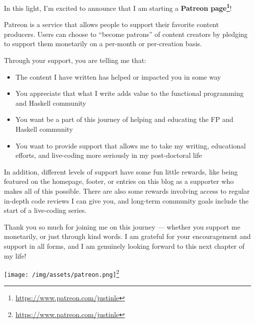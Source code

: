 \documentclass[]{article}
\renewcommand{\href}[2]{#2\footnote{\url{#1}}}
\begin{document}
In this light, I'm excited to announce that I am starting a
\textbf{\href{https://www.patreon.com/justinle}{Patreon page}}!

Patreon is a service that allows people to support their favorite content
producers. Users can choose to ``become patrons'' of content creators by
pledging to support them monetarily on a per-month or per-creation basis.

Through your support, you are telling me that:

\begin{itemize}
\tightlist
\item
  The content I have written has helped or impacted you in some way
\item
  You appreciate that what I write adds value to the functional programming and
  Haskell community
\item
  You want be a part of this journey of helping and educating the FP and Haskell
  community
\item
  You want to provide support that allows me to take my writing, educational
  efforts, and live-coding more seriously in my post-doctoral life
\end{itemize}

In addition, different levels of support have some fun little rewards, like
being featured on the homepage, footer, or entries on this blog as a supporter
who makes all of this possible. There are also some rewards involving access to
regular in-depth code reviews I can give you, and long-term community goals
include the start of a live-coding series.

Thank you so much for joining me on this journey --- whether you support me
monetarily, or just through kind words. I am grateful for your encouragement and
support in all forms, and I am genuinely looking forward to this next chapter of
my life!

\href{https://www.patreon.com/justinle}{\texttt{[image: /img/assets/patreon.png]}}
\end{document}
